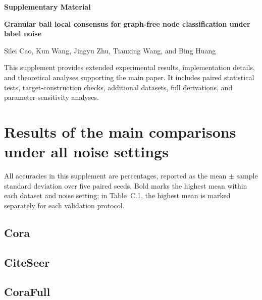 \documentclass[times,10pt]{elsarticle}
\begin{document}
\begin{center}
{\LARGE\bfseries Supplementary Material\par}
\vspace{0.6em}
{\large\bfseries Granular ball local consensus for graph-free node classification under label noise\par}
\vspace{0.9em}
{\footnotesize Silei Cao, Kun Wang, Jingyu Zhu, Tianxing Wang, and Bing Huang\par}
\end{center}
\vspace{0.8em}
\noindent
This supplement provides extended experimental results, implementation details, and theoretical analyses supporting the main paper. It includes paired statistical tests, target-construction checks, additional datasets, full derivations, and parameter-sensitivity analyses.
\par\medskip
\thispagestyle{plain}

\appendix
\renewcommand{\thetable}{\Alph{section}.\arabic{table}}
\renewcommand{\theHtable}{\Alph{section}.\arabic{table}}
\renewcommand{\thefigure}{\Alph{section}.\arabic{figure}}
\renewcommand{\theHfigure}{\Alph{section}.\arabic{figure}}
\setcounter{table}{0}
\setcounter{figure}{0}
\section{Results of the main comparisons under all noise settings}\label{sec:A}

All accuracies in this supplement are percentages, reported as the mean \(\pm\) sample standard deviation over five paired seeds. Bold marks the highest mean within each dataset and noise setting; in Table~C.1, the highest mean is marked separately for each validation protocol.


\subsection{Cora}\label{sec:A.1}




\subsection{CiteSeer}\label{sec:A.2}




\subsection{CoraFull}\label{sec:A.3}
\end{document}

